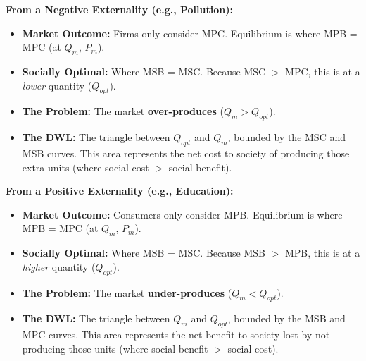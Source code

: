 \documentclass[11pt, a4paper, twoside]{book}
\begin{document}
\textbf{From a Negative Externality (e.g., Pollution):}
\begin{itemize}
  \item \textbf{Market Outcome:} Firms only consider MPC. Equilibrium is where MPB = MPC (at $Q_m$, $P_m$).
  \item \textbf{Socially Optimal:} Where MSB = MSC. Because MSC $>$ MPC, this is at a \emph{lower} quantity ($Q_{opt}$).
  \item \textbf{The Problem:} The market \textbf{over-produces} ($Q_m > Q_{opt}$).
  \item \textbf{The DWL:} The triangle between $Q_{opt}$ and $Q_m$, bounded by the MSC and MSB curves. This area represents the net cost to society of producing those extra units (where social cost $>$ social benefit).
\end{itemize}

\textbf{From a Positive Externality (e.g., Education):}
\begin{itemize}
  \item \textbf{Market Outcome:} Consumers only consider MPB. Equilibrium is where MPB = MPC (at $Q_m$, $P_m$).
  \item \textbf{Socially Optimal:} Where MSB = MSC. Because MSB $>$ MPB, this is at a \emph{higher} quantity ($Q_{opt}$).
  \item \textbf{The Problem:} The market \textbf{under-produces} ($Q_m < Q_{opt}$).
  \item \textbf{The DWL:} The triangle between $Q_m$ and $Q_{opt}$, bounded by the MSB and MPC curves. This area represents the net benefit to society lost by not producing those units (where social benefit $>$ social cost).
\end{itemize}
\end{document}
